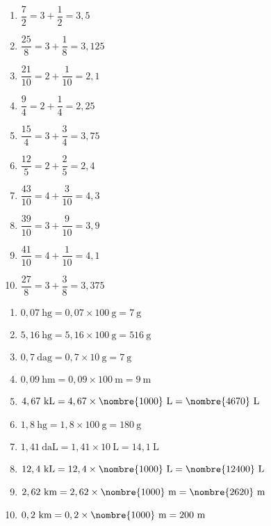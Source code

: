 \documentclass[a4paper,11pt,fleqn]{article}
\begin{document}
\begin{correction}
\exo{}

\begin{multicols}{2}
\begin{enumerate}[itemsep=2em]
	\item $ \dfrac{7}{2} = 3+\dfrac{1}{2} = 3,5 $
	\item $ \dfrac{25}{8} = 3+\dfrac{1}{8} = 3,125 $
	\item $ \dfrac{21}{10} = 2+\dfrac{1}{10} = 2,1 $
	\item $ \dfrac{9}{4} = 2+\dfrac{1}{4} = 2,25 $
	\item $ \dfrac{15}{4} = 3+\dfrac{3}{4} = 3,75 $
	\item $ \dfrac{12}{5} = 2+\dfrac{2}{5} = 2,4 $
	\item $ \dfrac{43}{10} = 4+\dfrac{3}{10} = 4,3 $
	\item $ \dfrac{39}{10} = 3+\dfrac{9}{10} = 3,9 $
	\item $ \dfrac{41}{10} = 4+\dfrac{1}{10} = 4,1 $
	\item $ \dfrac{27}{8} = 3+\dfrac{3}{8} = 3,375 $
\end{enumerate}
\end{multicols}

\exo{}

\begin{multicols}{2}
\begin{enumerate}
	\item $ 0,07~\text{hg} =  0,07\times100~\text{g} = 7~\text{g}$
	\item $ 5,16~\text{hg} =  5,16\times100~\text{g} = 516~\text{g}$
	\item $ 0,7~\text{dag} =  0,7\times10~\text{g} = 7~\text{g}$
	\item $ 0,09~\text{hm} =  0,09\times100~\text{m} = 9~\text{m}$
	\item $ 4,67~\text{kL} =  4,67\times\nombre{1000}~\text{L} = \nombre{4670}~\text{L}$
	\item $ 1,8~\text{hg} =  1,8\times100~\text{g} = 180~\text{g}$
	\item $ 1,41~\text{daL} =  1,41\times10~\text{L} = 14,1~\text{L}$
	\item $ 12,4~\text{kL} =  12,4\times\nombre{1000}~\text{L} = \nombre{12400}~\text{L}$
	\item $ 2,62~\text{km} =  2,62\times\nombre{1000}~\text{m} = \nombre{2620}~\text{m}$
	\item $ 0,2~\text{km} =  0,2\times\nombre{1000}~\text{m} = 200~\text{m}$
\end{enumerate}
\end{multicols}


\end{correction}
\end{document}
